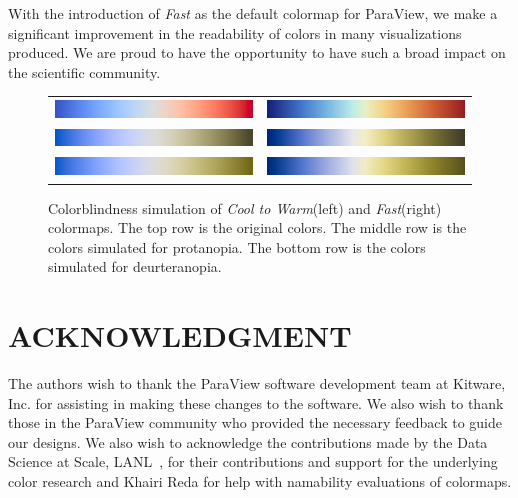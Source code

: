 \documentclass{IEEEcsmag}
\newcommand*{\colormap}[1]{\textsl{#1}\xspace}
\newcommand*{\coolwarm}{\colormap{Cool to Warm}}
\newcommand*{\fast}{\colormap{Fast}}
\begin{document}
With the introduction of \fast as the default colormap for ParaView, we make a significant improvement in the readability of colors in many visualizations produced. We are proud to have the opportunity to have such a broad impact on the scientific community.

\begin{figure}[htb]
  \centering
  \begin{tabular}{cc}
    \includegraphics[width=.44\linewidth, height=5mm]{map-cool-to-warm} & \includegraphics[width=.44\linewidth, height=5mm]{map-fast} \\
    \includegraphics[width=.44\linewidth, height=5mm]{map-protanopia-cool-to-warm} & \includegraphics[width=.44\linewidth, height=5mm]{map-protanopia-fast} \\
    \includegraphics[width=.44\linewidth, height=5mm]{map-deurteranopia-cool-to-warm} & \includegraphics[width=.44\linewidth, height=5mm]{map-deurteranopia-fast}
  \end{tabular}
  \caption{
    Colorblindness simulation of \coolwarm (left) and \fast (right) colormaps.
    The top row is the original colors.
    The middle row is the colors simulated for protanopia.
    The bottom row is the colors simulated for deurteranopia.
  }
  \label{fig:colorblindness}
\end{figure}

\section{ACKNOWLEDGMENT}

The authors wish to thank the ParaView software development team at Kitware, Inc. for assisting in making these changes to the software. We also wish to thank those in the ParaView community who provided the necessary feedback to guide our designs. We also wish to acknowledge the contributions made by the Data Science at Scale, LANL~\cite{SciVisColor}, for their contributions and support for the underlying color research and Khairi Reda for help with namability evaluations of colormaps.
\end{document}
